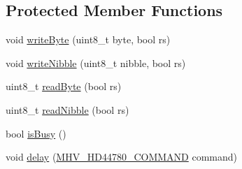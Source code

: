 \subsection*{\-Protected \-Member \-Functions}
\begin{DoxyCompactItemize}
\item 
void \hyperlink{class_m_h_v___display___h_d44780___direct___connect_ac61f7b7429e954bbb418ec6f2a7942f8}{write\-Byte} (uint8\-\_\-t byte, bool rs)
\item 
void \hyperlink{class_m_h_v___display___h_d44780___direct___connect_afe47f18f28ff286d1d6a8e1018ae1ca1}{write\-Nibble} (uint8\-\_\-t nibble, bool rs)
\item 
uint8\-\_\-t \hyperlink{class_m_h_v___display___h_d44780___direct___connect_a395c757364dfea8eccb8d42d83d5060c}{read\-Byte} (bool rs)
\item 
uint8\-\_\-t \hyperlink{class_m_h_v___display___h_d44780___direct___connect_a8d4e15ba142eb565a021f17645fe6d0a}{read\-Nibble} (bool rs)
\item 
bool \hyperlink{class_m_h_v___display___h_d44780___direct___connect_af91e71543df100ec60594c9094cbd444}{is\-Busy} ()
\item 
void \hyperlink{class_m_h_v___display___h_d44780___direct___connect_a07880e34d8ef2ac2c31c3cfa52a87fa9}{delay} (\hyperlink{_m_h_v___display___h_d44780_8h_a76bff68a0c366080486a09e3beec77e1}{\-M\-H\-V\-\_\-\-H\-D44780\-\_\-\-C\-O\-M\-M\-A\-N\-D} command)
\end{DoxyCompactItemize}

